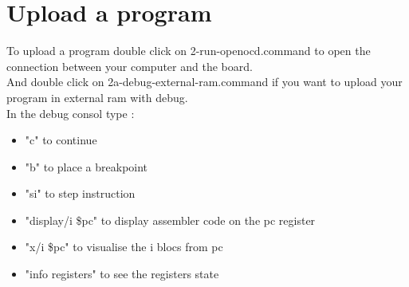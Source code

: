 \section{Upload a program} \label{uploadprogram}
To upload a program double click on 2-run-openocd.command to open the connection between your computer and the board.\\
And double click on 2a-debug-external-ram.command if you want to upload your program in external ram with debug.\\
In the debug consol type :
\begin{itemize}
\item "c" to continue
\item "b" to place a breakpoint
\item "si" to step instruction
\item "display/i \$pc" to display assembler code on the pc register
\item "x/i \$pc" to visualise the i blocs from pc
\item "info registers" to see the registers state
\end{itemize}

